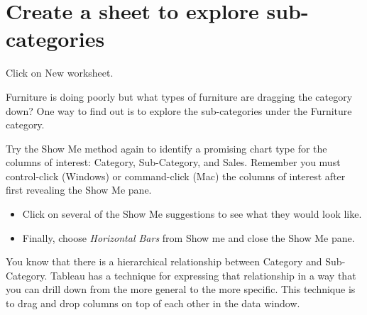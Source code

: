 \section{Create a sheet to explore
sub-categories}\label{create-a-sheet-to-explore-sub-categories}

Click on New worksheet.

Furniture is doing poorly but what types of furniture are dragging the
category down? One way to find out is to explore the sub-categories
under the Furniture category.

Try the Show Me method again to identify a promising chart type for the
columns of interest: Category, Sub-Category, and Sales. Remember you
must control-click (Windows) or command-click (Mac) the columns of
interest after first revealing the Show Me pane.

\begin{itemize}
\tightlist
\item
  Click on several of the Show Me suggestions to see what they would
  look like.
\item
  Finally, choose \emph{Horizontal Bars} from Show me and close the Show
  Me pane.
\end{itemize}

You know that there is a hierarchical relationship between Category and
Sub-Category. Tableau has a technique for expressing that relationship
in a way that you can drill down from the more general to the more
specific. This technique is to drag and drop columns on top of each
other in the data window.

